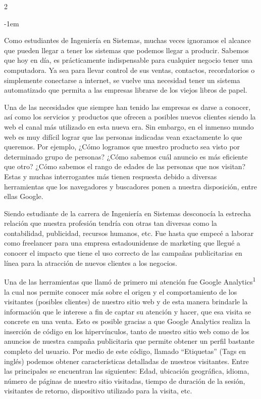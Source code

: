 \documentclass[12pt,spanish,Letterpaper,openany]{book}
\newenvironment{smalltextenv}
  {\begin{center}\kern-1em\color{fondotitulo}\small}%
  {\end{center}}%
\begin{document}
\begin {multicols}{2}
\begin {smalltextenv}
\end {smalltextenv}

Como estudiantes de Ingeniería en Sistemas, muchas veces ignoramos el alcance que pueden llegar a tener los sistemas que podemos llegar a producir. Sabemos que hoy en día, es prácticamente indispensable para cualquier negocio tener una computadora. Ya sea para llevar control de sus ventas, contactos, recordatorios o simplemente conectarse a internet, se vuelve una necesidad tener un sistema automatizado que permita a las empresas librarse de los viejos libros de papel.

Una de las necesidades que siempre han tenido las empresas es darse a conocer, así como los servicios y productos que ofrecen a posibles nuevos clientes siendo la web el canal más utilizado en esta nueva era. Sin embargo, en el inmenso mundo web es muy difícil lograr que las personas indicadas vean exactamente lo que queremos. Por ejemplo, ¿Cómo logramos que nuestro producto sea visto por determinado grupo de personas? ¿Cómo sabemos cuál anuncio es más eficiente que otro? ¿Cómo sabemos el rango de edades de las personas que nos visitan? Estas y muchas interrogantes más tienen respuesta debido a diversas herramientas que los navegadores y buscadores ponen a nuestra disposición, entre ellas Google.

Siendo estudiante de la carrera de Ingeniería en Sistemas desconocía la estrecha relación que nuestra profesión tendría con otras tan diversas como la contabilidad, publicidad, recursos humanos, etc. Fue hasta que empecé a laborar como freelancer para una empresa estadounidense de marketing que llegué a conocer el impacto que tiene el uso correcto de las campañas publicitarias en línea para la atracción de nuevos clientes a los negocios.

Una de las herramientas que llamó de primero mi atención fue Google Analytics\textsuperscript{1} la cual nos permite conocer más sobre el origen y el comportamiento de los visitantes (posibles clientes) de nuestro sitio web y de esta manera brindarle la información que le interese a fin de captar su atención y hacer, que esa visita se concrete en una venta. Esto es posible gracias a que Google Analytics realiza la inserción de código en los hipervínculos, tanto de nuestro sitio web como de los anuncios de nuestra campaña publicitaria que permite obtener un perfil bastante completo del usuario. Por medio de este código, llamado ``Etiquetas'' (Tags en inglés) podemos obtener características detalladas de nuestros visitantes. Entre las principales se encuentran las siguientes: Edad, ubicación geográfica, idioma, número de páginas de nuestro sitio visitadas, tiempo de duración de la sesión, visitantes de retorno, dispositivo utilizado para la visita, etc.


\end{multicols}
\end{document}
